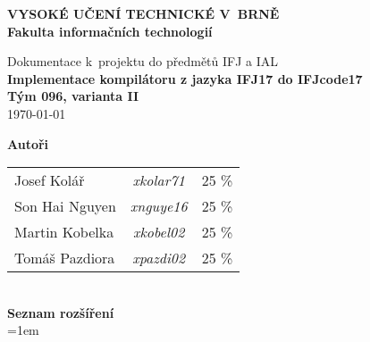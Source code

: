 \begin{titlepage}
    \centering

    {\fontsize{20pt}{15pt}\bfseries
    VYSOKÉ UČENÍ TECHNICKÉ V~BRNĚ\\
    \vspace{8pt}
    Fakulta informačních technologií
    }

    \vspace*{64pt}

    
    \vspace*{22pt}

    {\Large Dokumentace k~projektu do předmětů IFJ a IAL\\}
    \vspace*{18pt}
    {\LARGE \bfseries Implementace kompilátoru z jazyka IFJ17 do IFJcode17\\}
    \vspace*{62pt}
    {\Large \bfseries Tým 096, varianta II\\}
    \vspace*{42pt}
    {\Large \today}

    \vspace*{64pt}
    {\Large \bfseries Autoři\\}
    \vspace*{8pt}
    \begin{tabular}{ l c r }
        Josef Kolář & \textit{xkolar71} & 25 \% \\
        Son Hai Nguyen & \textit{xnguye16} & 25 \% \\
        Martin Kobelka & \textit{xkobel02} & 25 \% \\
        Tomáš Pazdiora & \textit{xpazdi02} & 25 \% \\
    \end{tabular}\\
    \vspace*{92pt}
    {\Large \bfseries Seznam rozšíření\\}
    \vspace*{18pt}
    {\spaceskip=1em }\\ %

\end{titlepage}
